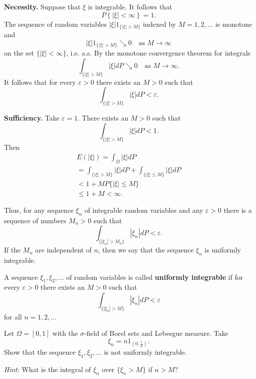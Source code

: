 \begin{Solution}
\label{sol:Exercise43}
\textbf{Necessity.} Suppose that $\xi$ is integrable. It follows that
\[
P \left\{\left| \xi \right| < \infty \right\} = 1.
\]
The sequence of random variables $|\xi| 1_{\{|\xi|>M\}}$ indexed by $M = 1,2,\ldots$ is monotone and
\[
| \xi | 1_{\{|\xi| > M\}} \searrow 0 \quad \text{as } M \to \infty
\]
on the set $\{|\xi| < \infty\}$, i.e. a.s. By the monotone convergence theorem for integrals
\[
\int_{\{|\xi| > M\}} | \xi | d P \searrow 0 \quad \text{as } M \to \infty .
\]
It follows that for every $\varepsilon > 0$ there exists an $M > 0$ such that
\[
\int_{\{|\xi| > M\}} | \xi | d P < \varepsilon .
\]

\textbf{Sufficiency.} Take $\varepsilon = 1$. There exists an $M > 0$ such that
\[
\int_{\{|\xi| > M\}} | \xi | d P < 1.
\]
Then
\[
\begin{array}{l}
E (| \xi |) = \int_{\Omega} | \xi | d P \\
= \int_{\{|\xi| > M\}} | \xi | d P + \int_{\{|\xi| \leq M\}} | \xi | d P \\
< 1 + M P \{|\xi| \leq M \} \\
\leq 1 + M < \infty .
\end{array}
\]
\end{Solution}

Thus, for any sequence $\xi_{n}$ of integrable random variables and any $\varepsilon > 0$ there is a sequence of numbers $M_{n} > 0$ such that
\[
\int_{\{| \xi_{n} | > M_{n} \}} | \xi_{n} | d P < \varepsilon .
\]
If the $M_{n}$ are independent of $n$, then we say that the sequence $\xi_{n}$ is uniformly integrable.

\begin{Definition}
\label{def:UniformIntegrability}
A sequence $\xi_1, \xi_2, \ldots$ of random variables is called \textbf{uniformly integrable} if for every $\varepsilon > 0$ there exists an $M > 0$ such that
\[
\int_{\{| \xi_{n} | > M \}} | \xi_{n} | d P < \varepsilon
\]
for all $n = 1,2,\ldots$
\end{Definition}

\begin{Exercise}
\label{ex:NonUniformlyIntegrableExample}
Let $\Omega = [0,1]$ with the $\sigma$-field of Borel sets and Lebesgue measure. Take
\[
\xi_{n} = n 1_{(0, \frac{1}{n})}.
\]
Show that the sequence $\xi_1, \xi_2, \ldots$ is not uniformly integrable.

\textit{Hint}: What is the integral of $\xi_{n}$ over $\{\xi_n > M\}$ if $n > M$?
\end{Exercise}

